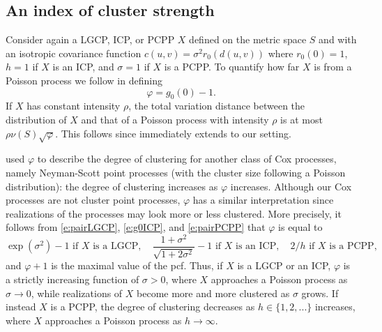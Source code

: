 \documentclass[alpha-refs]{wiley-article}
\begin{document}
\subsection{An index of cluster strength}
Consider again a LGCP, ICP, or PCPP $X$ defined on the metric space $S$ and with an isotropic covariance function $c(u,v)=\sigma^2r_0(d(u,v))$ where $r_0(0)=1$, $h=1$ if $X$ is an ICP, and $\sigma=1$ if $X$ is a PCPP. 
To quantify how far $X$ is 
from a Poisson process we follow 
\citet{BadEtAl2022} in defining 
\begin{equation}\label{e:varphi}
\varphi=g_0(0)-1.
\end{equation}
If $X$ has constant intensity $\rho$,
the total variation distance between the distribution of $X$ and that of a Poisson process with intensity $\rho$ is at most $\rho\nu(S)\sqrt\varphi$. This follows since 
\citet[][Lemma~9]{BadEtAl2022} immediately extends to our setting.

\citet{BadEtAl2022} used $\varphi$ to describe the degree of clustering for another class of Cox processes, namely Neyman-Scott point processes (with the cluster size following a Poisson distribution): the degree of clustering increases as $\varphi$ increases. 
Although our Cox processes are not cluster point processes, $\varphi$ has a similar interpretation since realizations of the processes may look more or less clustered. More precisely, 
it follows from \eqref{e:pairLGCP}, \eqref{e:g0ICP}, and \eqref{e:pairPCPP} that $\varphi$ is equal to
\begin{equation}\label{e:varphiICP}
\exp(\sigma^2)-1\mbox{ if $X$ is a LGCP},\quad 
\frac{1+\sigma^2}{\sqrt{1+2\sigma^2}}-1\mbox{ if $X$ is an ICP},\quad 
2/h \mbox{ if $X$ is a PCPP,}
\end{equation}
and $\varphi+1$ is the maximal value of the pcf.
Thus, if $X$ is a LGCP or an ICP, $\varphi$ is a strictly increasing function of $\sigma>0$, where $X$ approaches a Poisson process as $\sigma\rightarrow0$, while realizations of $X$ become more and more clustered as $\sigma$ grows. If instead $X$ is a PCPP, the degree of clustering decreases as $h\in\{1,2,...\}$ increases, where $X$ approaches a Poisson process as $h\rightarrow\infty$. 
\end{document}
